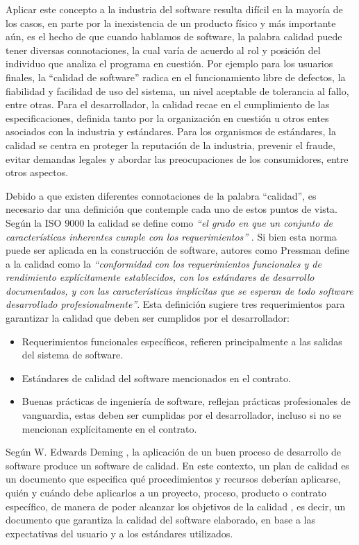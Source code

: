 \documentclass[a4paper,10pt]{article}
\begin{document}
	Aplicar este concepto a la industria del software resulta difícil en la mayoría de los casos, en parte por la inexistencia de un producto físico y más importante aún, es el hecho de que cuando hablamos de software, la palabra calidad puede tener diversas connotaciones, la cual varía de acuerdo al rol y posición del individuo que analiza el programa en cuestión. Por ejemplo para los usuarios finales, la “calidad de software” radica en el funcionamiento libre de defectos, la fiabilidad y facilidad de uso del sistema, un nivel aceptable de tolerancia al fallo, entre otras. Para el desarrollador, la calidad recae en el cumplimiento de las especificaciones, definida tanto por la organización en cuestión u otros entes asociados con la industria y estándares. Para los organismos de estándares, la calidad se centra en proteger la reputación de la industria, prevenir el fraude, evitar demandas legales y abordar las preocupaciones de los consumidores, entre otros aspectos.
	
	Debido a que existen diferentes connotaciones de la palabra “calidad”, es necesario dar una definición que contemple cada uno de estos puntos de vista. Según la ISO 9000 la calidad se define como \textit{“el grado en que un conjunto de características inherentes cumple con los requerimientos”} \parencite{ISO_9001_2015}. Si bien esta norma puede ser aplicada en la construcción de software, autores como Pressman \parencite{Pressman_2010} define a la calidad como la \textit{“conformidad con los requerimientos funcionales y de rendimiento explícitamente establecidos, con los estándares de desarrollo documentados, y con las características implícitas que se esperan de todo software desarrollado profesionalmente”}. Esta definición sugiere tres requerimientos para garantizar la calidad que deben ser cumplidos por el desarrollador:
	
	\begin{itemize}
		\item Requerimientos funcionales específicos, refieren principalmente a las salidas del sistema de software.
		\item Estándares de calidad del software mencionados en el contrato.
		\item Buenas prácticas de ingeniería de software, reflejan prácticas profesionales de vanguardia, estas deben ser cumplidas por el desarrollador, incluso si no se mencionan explícitamente en el contrato.
	\end{itemize}
	
	Según W. Edwards Deming \parencite{Deming_2018}, la aplicación de un buen proceso de desarrollo de software produce un software de calidad. En este contexto, un plan de calidad es un documento que especifica qué procedimientos y recursos deberían aplicarse, quién y cuándo debe aplicarlos a un proyecto, proceso, producto o contrato específico, de manera de poder alcanzar los objetivos de la calidad \parencite{Álvarez_López_2005}, es decir, un documento que garantiza la calidad del software elaborado, en base a las expectativas del usuario y a los estándares utilizados.
	
\end{document}
